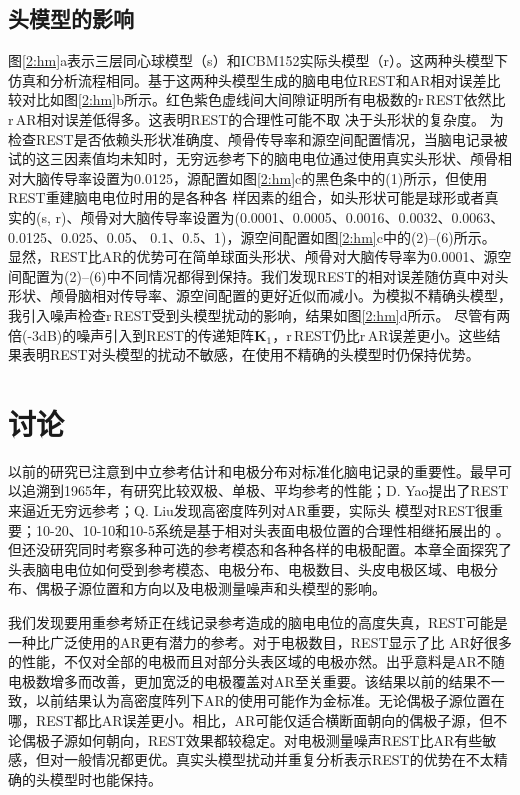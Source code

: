 \subsection{头模型的影响}
\label{2:hm-disturb}
图\ref{2:hm}a表示三层同心球模型（s）和ICBM152实际头模型（r）。这两种头模型下仿真和分析流程相同。基于这两种头模型生成的脑电电位REST和AR相对误差比较对比如图\ref{2:hm}b所示。红色紫色虚线间大间隙证明所有电极数的r\,REST依然比r\,AR相对误差低得多。这表明REST的合理性可能不取
决于头形状的复杂度。 为检查REST是否依赖头形状准确度、颅骨传导率和源空间配置情况，当脑电记录被试的这三因素值均未知时，无穷远参考下的脑电电位通过使用真实头形状、颅骨相对大脑传导率设置为0.0125，源配置如图\ref{2:hm}c的黑色条中的(1)所示，但使用REST重建脑电电位时用的是各种各
样因素的组合，如头形状可能是球形或者真实的(s, r)、颅骨对大脑传导率设置为(0.0001、0.0005、0.0016、0.0032、0.0063、0.0125、0.025、0.05、
0.1、0.5、1)，源空间配置如图\ref{2:hm}c中的(2)–(6)所示。 显然，REST比AR的优势可在简单球面头形状、颅骨对大脑传导率为0.0001、源空间配置为(2)–(6)中不同情况都得到保持。我们发现REST的相对误差随仿真中对头形状、颅骨脑相对传导率、源空间配置的更好近似而减小。为模拟不精确头模型，我引入噪声检查r\,REST受到头模型扰动的影响，结果如图\ref{2:hm}d所示。 尽管有两倍(-3dB)的噪声引入到REST的传递矩阵$\mathbf{K}_1$，r\,REST仍比r\,AR误差更小。这些结果表明REST对头模型的扰动不敏感，在使用不精确的头模型时仍保持优势。

\section{讨论}
以前的研究已注意到中立参考估计和电极分布对标准化脑电记录的重要性。最早可以追溯到1965年，有研究比较双极、单极、平均参考的性能；D. Yao提出了REST来逼近无穷远参考；Q. Liu发现高密度阵列对AR重要，实际头
模型对REST很重要；10-20、10-10和10-5系统是基于相对头表面电极位置的合理性相继拓展出的
。但还没研究同时考察多种可选的参考模态和各种各样的电极配置。本章全面探究了头表脑电电位如何受到参考模态、电极分布、电极数目、头皮电极区域、电极分布、偶极子源位置和方向以及电极测量噪声和头模型的影响。

我们发现要用重参考矫正在线记录参考造成的脑电电位的高度失真，REST可能是一种比广泛使用的AR更有潜力的参考。对于电极数目，REST显示了比
AR好很多的性能，不仅对全部的电极而且对部分头表区域的电极亦然。出乎意料是AR不随电极数增多而改善，更加宽泛的电极覆盖对AR至关重要。该结果以前的结果不一致，以前结果认为高密度阵列下AR的使用可能作为金标准。无论偶极子源位置在哪，REST都比AR误差更小。相比，AR可能仅适合横断面朝向的偶极子源，但不论偶极子源如何朝向，REST效果都较稳定。对电极测量噪声REST比AR有些敏感，但对一般情况都更优。真实头模型扰动并重复分析表示REST的优势在不太精确的头模型时也能保持。

